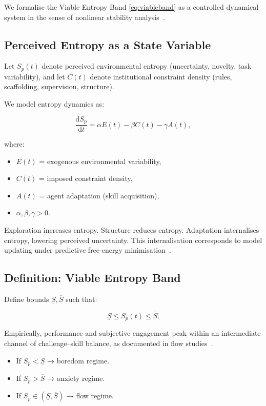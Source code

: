 \documentclass[12pt,a4paper]{article}
\theoremstyle{definition}
\newcommand{\ddt}[1]{\frac{\mathrm{d}#1}{\mathrm{d}t}}
\begin{document}
We formalise the Viable Entropy Band \eqref{eq:viableband}
as a controlled dynamical system in the sense of nonlinear stability
analysis~\citep{strogatz2018}.

\subsection{Perceived Entropy as a State Variable}

Let $S_p(t)$ denote perceived environmental entropy
(uncertainty, novelty, task variability),
and let $C(t)$ denote institutional constraint density
(rules, scaffolding, supervision, structure).

We model entropy dynamics as:

\begin{equation}
  \ddt{S_p} =
  \alpha E(t)
  - \beta C(t)
  - \gamma A(t),
  \label{eq:entropy_dynamics}
\end{equation}

where:

\begin{itemize}
  \item $E(t)$ = exogenous environmental variability,
  \item $C(t)$ = imposed constraint density,
  \item $A(t)$ = agent adaptation (skill acquisition),
  \item $\alpha,\beta,\gamma > 0$.
\end{itemize}

Exploration increases entropy.
Structure reduces entropy.
Adaptation internalises entropy, lowering perceived uncertainty.
This internalisation corresponds to model updating under predictive
free-energy minimisation~\citep{friston2023}.

\subsection{Definition: Viable Entropy Band}

Define bounds $\underline{S}, \overline{S}$ such that:

\begin{equation}
  \underline{S} \leq S_p(t) \leq \overline{S}.
\end{equation}

Empirically, performance and subjective engagement peak within
an intermediate channel of challenge–skill balance,
as documented in flow studies~\citep{csikszentmihalyi1990}.

\begin{itemize}
  \item If $S_p < \underline{S}$ → boredom regime.
  \item If $S_p > \overline{S}$ → anxiety regime.
  \item If $S_p \in (\underline{S}, \overline{S})$ → flow regime.
\end{itemize}
\end{document}
